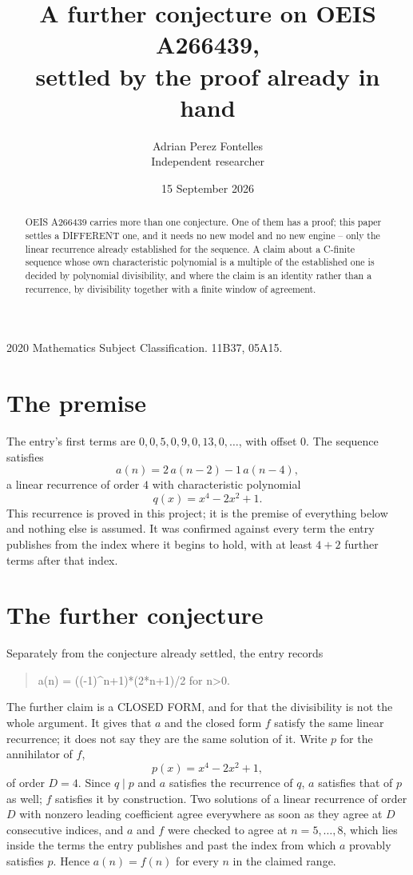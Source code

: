 \documentclass[11pt,a4paper]{article}
\title{A further conjecture on OEIS A266439,\\ \large settled by the proof already in hand}
\author{Adrian Perez Fontelles\\ \small Independent researcher}
\date{15 September 2026}
\theoremstyle{plain}
\theoremstyle{definition}
\begin{document}
\maketitle

\begin{abstract}
OEIS A266439 carries more than one conjecture. One of them has a proof; this paper settles a
DIFFERENT one, and it needs no new model and no new engine -- only the linear recurrence already
established for the sequence. A claim about a C-finite sequence whose own characteristic
polynomial is a multiple of the established one is decided by polynomial divisibility, and where
the claim is an identity rather than a recurrence, by divisibility together with a finite window
of agreement.
\end{abstract}

\noindent\small 2020 Mathematics Subject Classification. 11B37, 05A15.\normalsize

\section{The premise}

The entry's first terms are $0, 0, 5, 0, 9, 0, 13, 0,\dots$, with offset $0$. The sequence satisfies
\[
  a(n)=2\,a(n-2) - 1\,a(n-4) ,
\]
a linear recurrence of order $4$ with characteristic polynomial
\[
  q(x)=x^{4} - 2 x^{2} + 1 .
\]
This recurrence is proved in this project; it is the premise of everything below and nothing else is assumed.
It was confirmed against every term the entry publishes from the index where it begins to hold,
with at least $4+2$ further terms after that index.

\section{The further conjecture}

Separately from the conjecture already settled, the entry records

\begin{quote}\raggedright a(n) = ((-1)\^{}n+1)*(2*n+1)/2 for n>0.\end{quote}

The further claim is a CLOSED FORM, and for that the divisibility is not the whole argument. It
gives that $a$ and the closed form $f$ satisfy the same linear recurrence; it does not say they
are the same solution of it. Write $p$ for the annihilator of $f$,
\[
  p(x)=x^{4} - 2 x^{2} + 1 ,
\]
of order $D=4$. Since $q\mid p$ and $a$ satisfies the recurrence of $q$, $a$ satisfies that of
$p$ as well; $f$ satisfies it by construction. Two solutions of a linear recurrence of order $D$
with nonzero leading coefficient agree everywhere as soon as they agree at $D$ consecutive
indices, and $a$ and $f$ were checked to agree at $n=5,\dots,8$,
which lies inside the terms the entry publishes and past the index from which $a$ provably
satisfies $p$. Hence $a(n)=f(n)$ for every $n$ in the claimed range.
\end{document}
